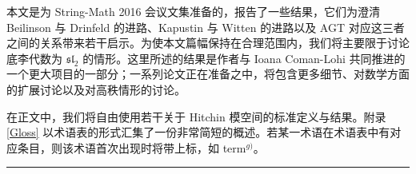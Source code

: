 本文是为 String-Math 2016 会议文集准备的，报告了一些结果，它们为澄清 Beilinson 与 Drinfeld 的进路、Kapustin 与 Witten 的进路以及 AGT 对应这三者之间的关系带来若干启示。为使本文篇幅保持在合理范围内，我们将主要限于讨论底李代数为 $\mathfrak{sl}_2$ 的情形。这里所述的结果是作者与 Ioana Coman-Lohi 共同推进的一个更大项目的一部分；一系列论文正在准备之中，将包含更多细节、对数学方面的扩展讨论以及对高秩情形的讨论。

在正文中，我们将自由使用若干关于 Hitchin 模空间的标准定义与结果。附录 \ref{Gloss} 以术语表的形式汇集了一份非常简短的概述。若某一术语在术语表中有对应条目，则该术语首次出现时将带上标，如 term$^{g)}$。

\bigskip
\noindent\rule{\textwidth}{0.6pt}

